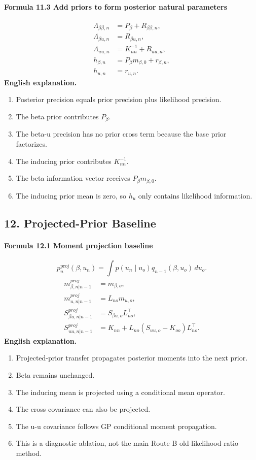 \documentclass[12pt]{article}
\begin{document}
\paragraph{Formula 11.3 Add priors to form posterior natural parameters}
\[
\begin{aligned}
\Lambda_{\beta\beta,n}&=P_\beta+R_{\beta\beta,n},\\
\Lambda_{\beta u,n}&=R_{\beta u,n},\\
\Lambda_{uu,n}&=K_{nn}^{-1}+R_{uu,n},\\
h_{\beta,n}&=P_\beta m_{\beta,0}+r_{\beta,n},\\
h_{u,n}&=r_{u,n}.
\end{aligned}
\]
\textbf{English explanation.}
\begin{enumerate}[leftmargin=2em]
\item Posterior precision equals prior precision plus likelihood precision.
\item The beta prior contributes \(P_\beta\).
\item The beta-u precision has no prior cross term because the base prior factorizes.
\item The inducing prior contributes \(K_{nn}^{-1}\).
\item The beta information vector receives \(P_\beta m_{\beta,0}\).
\item The inducing prior mean is zero, so \(h_u\) only contains likelihood information.
\end{enumerate}

\subsection{12. Projected-Prior Baseline}
\paragraph{Formula 12.1 Moment projection baseline}
\[
p_n^{\mathrm{proj}}(\beta,u_n)
=
\int p(u_n\mid u_o)q_{n-1}(\beta,u_o)\,du_o.
\]
\[
\begin{aligned}
m_{\beta,n|n-1}^{proj}&=m_{\beta,o},\\
m_{u,n|n-1}^{proj}&=L_{no}m_{u,o},\\
S_{\beta u,n|n-1}^{proj}&=S_{\beta u,o}L_{no}^\top,\\
S_{uu,n|n-1}^{proj}
&=K_{nn}+L_{no}(S_{uu,o}-K_{oo})L_{no}^\top.
\end{aligned}
\]
\textbf{English explanation.}
\begin{enumerate}[leftmargin=2em]
\item Projected-prior transfer propagates posterior moments into the next prior.
\item Beta remains unchanged.
\item The inducing mean is projected using a conditional mean operator.
\item The cross covariance can also be projected.
\item The u-u covariance follows GP conditional moment propagation.
\item This is a diagnostic ablation, not the main Route B old-likelihood-ratio method.
\end{enumerate}
\end{document}
